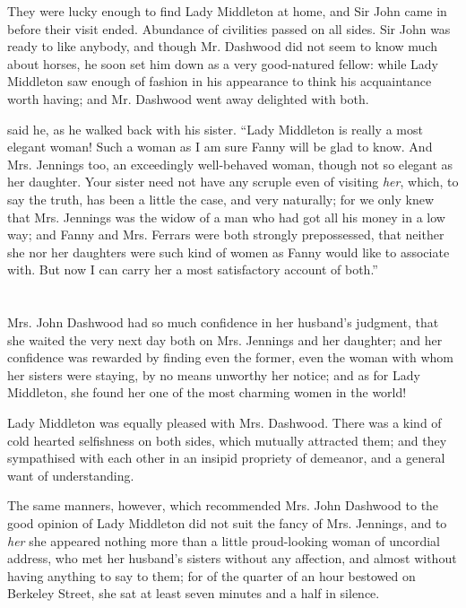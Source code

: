 They were lucky enough to find Lady Middleton at home, and Sir John came in before their visit ended. Abundance of civilities passed on all sides. Sir John was ready to like anybody, and though Mr. Dashwood did not seem to know much about horses, he soon set him down as a very good-natured fellow: while Lady Middleton saw enough of fashion in his appearance to think his acquaintance worth having; and Mr. Dashwood went away delighted with both.

 said he, as he walked back with his sister. “Lady Middleton is really a most elegant woman! Such a woman as I am sure Fanny will be glad to know. And Mrs. Jennings too, an exceedingly well-behaved woman, though not so elegant as her daughter. Your sister need not have any scruple even of visiting {\em her}, which, to say the truth, has been a little the case, and very naturally; for we only knew that Mrs. Jennings was the widow of a man who had got all his money in a low way; and Fanny and Mrs. Ferrars were both strongly prepossessed, that neither she nor her daughters were such kind of women as Fanny would like to associate with. But now I can carry her a most satisfactory account of both.”

\chapter{} %

Mrs. John Dashwood had so much confidence in her husband's judgment, that she waited the very next day both on Mrs. Jennings and her daughter; and her confidence was rewarded by finding even the former, even the woman with whom her sisters were staying, by no means unworthy her notice; and as for Lady Middleton, she found her one of the most charming women in the world!

Lady Middleton was equally pleased with Mrs. Dashwood. There was a kind of cold hearted selfishness on both sides, which mutually attracted them; and they sympathised with each other in an insipid propriety of demeanor, and a general want of understanding.

The same manners, however, which recommended Mrs. John Dashwood to the good opinion of Lady Middleton did not suit the fancy of Mrs. Jennings, and to {\em her} she appeared nothing more than a little proud-looking woman of uncordial address, who met her husband's sisters without any affection, and almost without having anything to say to them; for of the quarter of an hour bestowed on Berkeley Street, she sat at least seven minutes and a half in silence.

